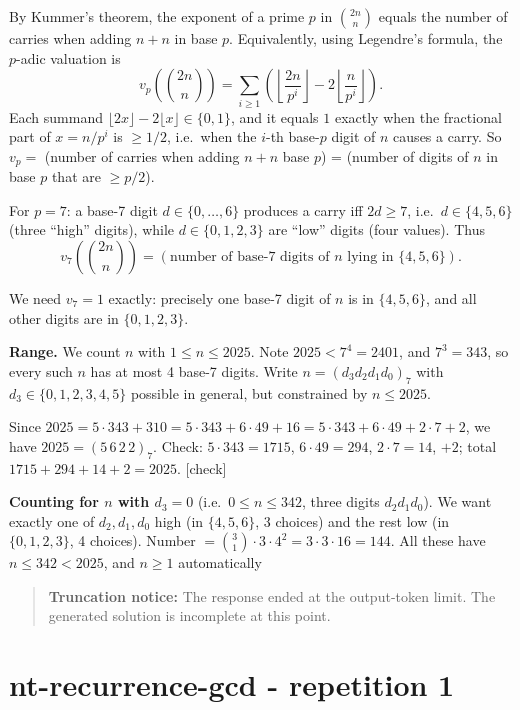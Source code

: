 \documentclass[
  11pt,
  letterpaper,
]{article}
\begin{document}
By Kummer's theorem, the exponent of a prime \(p\) in \(\binom{2n}{n}\)
equals the number of carries when adding \(n+n\) in base \(p\).
Equivalently, using Legendre's formula, the \(p\)-adic valuation is
\[v_p\!\left(\binom{2n}{n}\right) = \sum_{i\ge1}\left(\left\lfloor \frac{2n}{p^i}\right\rfloor - 2\left\lfloor \frac{n}{p^i}\right\rfloor\right).\]
Each summand \(\lfloor 2x\rfloor - 2\lfloor x\rfloor \in \{0,1\}\), and
it equals \(1\) exactly when the fractional part of \(x=n/p^i\) is
\(\ge 1/2\), i.e.~when the \(i\)-th base-\(p\) digit of \(n\) causes a
carry. So \(v_p =\) (number of carries when adding \(n+n\) base \(p\)) =
(number of digits of \(n\) in base \(p\) that are \(\ge p/2\)).

For \(p=7\): a base-7 digit \(d\in\{0,\dots,6\}\) produces a carry iff
\(2d \ge 7\), i.e.~\(d \in \{4,5,6\}\) (three ``high'' digits), while
\(d\in\{0,1,2,3\}\) are ``low'' digits (four values). Thus
\[v_7\!\left(\binom{2n}{n}\right) = (\text{number of base-7 digits of } n \text{ lying in } \{4,5,6\}).\]

We need \(v_7 = 1\) exactly: precisely one base-7 digit of \(n\) is in
\(\{4,5,6\}\), and all other digits are in \(\{0,1,2,3\}\).

\textbf{Range.} We count \(n\) with \(1 \le n \le 2025\). Note
\(2025 < 7^4 = 2401\), and \(7^3 = 343\), so every such \(n\) has at
most 4 base-7 digits. Write \(n = (d_3 d_2 d_1 d_0)_7\) with
\(d_3 \in \{0,1,2,3,4,5\}\) possible in general, but constrained by
\(n \le 2025\).

Since
\(2025 = 5\cdot 343 + 310 = 5\cdot 343 + 6\cdot49 + 16 = 5\cdot343 + 6\cdot49 + 2\cdot7 + 2\),
we have \(2025 = (5\,6\,2\,2)_7\). Check: \(5\cdot343=1715\),
\(6\cdot49=294\), \(2\cdot7=14\), \(+2\); total
\(1715+294+14+2 = 2025\). {[}check{]}

\textbf{Counting for \(n\) with \(d_3 = 0\)} (i.e.~\(0 \le n \le 342\),
three digits \(d_2 d_1 d_0\)). We want exactly one of \(d_2,d_1,d_0\)
high (in \(\{4,5,6\}\), 3 choices) and the rest low (in \(\{0,1,2,3\}\),
4 choices). Number
\(= \binom{3}{1}\cdot 3 \cdot 4^2 = 3\cdot3\cdot16 = 144\). All these
have \(n \le 342 < 2025\), and \(n\ge1\) automatically

\begin{quote}
\textbf{Truncation notice:} The response ended at the output-token
limit. The generated solution is incomplete at this point.
\end{quote}

\clearpage

\section{nt-recurrence-gcd - repetition
1}\label{nt-recurrence-gcd---repetition-1}
\end{document}
